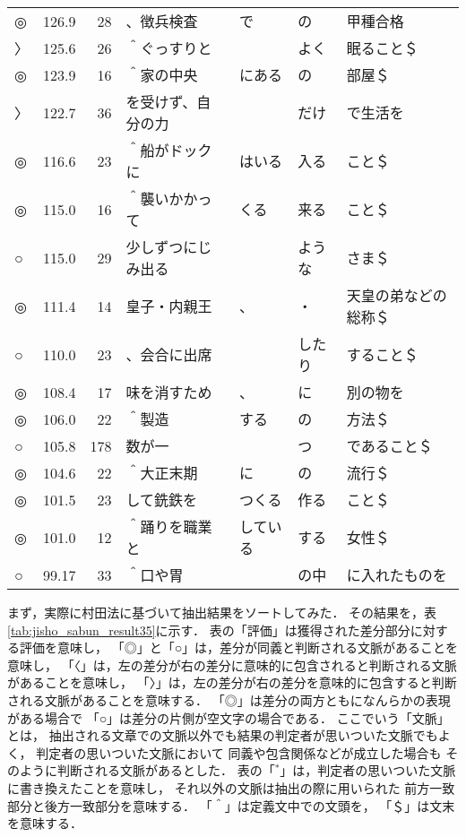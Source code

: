 \begin{table*}[p]
\begin{center}
\begin{tabular}[h]{|l@{ }|r@{ }|r@{ }|l@{ }|l@{ }|l@{ }|l@{ }|}
◎   & 126.9 &  28 & 、徴兵検査           & で         & の         & 甲種合格            \\
〉   & 125.6 &  26 & ＾ぐっすりと         &            & よく       & 眠ること＄          \\
◎   & 123.9 &  16 & ＾家の中央           & にある     & の         & 部屋＄              \\
〉   & 122.7 &  36 & を受けず、自分の力   &            & だけ       & で生活を            \\
◎   & 116.6 &  23 & ＾船がドックに       & はいる     & 入る       & こと＄              \\
◎   & 115.0 &  16 & ＾襲いかかって       & くる       & 来る       & こと＄              \\
○   & 115.0 &  29 & 少しずつにじみ出る   &            & ような     & さま＄              \\
◎   & 111.4 &  14 & 皇子・内親王         & 、         & ・         & 天皇の弟などの総称＄\\
○   & 110.0 &  23 & 、会合に出席         &            & したり     & すること＄          \\
◎   & 108.4 &  17 & 味を消すため         & 、         & に         & 別の物を            \\
◎   & 106.0 &  22 & ＾製造               & する       & の         & 方法＄              \\
○   & 105.8 & 178 & 数が一               &            & つ         & であること＄        \\
◎   & 104.6 &  22 & ＾大正末期           & に         & の         & 流行＄              \\
◎   & 101.5 &  23 & して銑鉄を           & つくる     & 作る       & こと＄              \\
◎   & 101.0 &  12 & ＾踊りを職業と       & している   & する       & 女性＄              \\
○   & 99.17 &  33 & ＾口や胃             &            & の中       & に入れたものを      \\\hline
\end{tabular}
  \end{center}
\end{table*}

まず，実際に村田法に基づいて抽出結果をソートしてみた．
その結果を，表\ref{tab:jisho_sabun_result35}に示す．
表の「評価」は獲得された差分部分に対する評価を意味し，
「◎」と「○」は，差分が同義と判断される文脈があることを意味し，
「〈」は，左の差分が右の差分に意味的に包含されると判断される文脈があることを意味し，
「〉」は，左の差分が右の差分を意味的に包含すると判断される文脈があることを意味する．
「◎」は差分の両方ともになんらかの表現がある場合で
「○」は差分の片側が空文字の場合である．
ここでいう「文脈」とは，
抽出される文章での文脈以外でも結果の判定者が思いついた文脈でもよく，
判定者の思いついた文脈において
同義や包含関係などが成立した場合も
そのように判断される文脈があるとした．
表の「$^*$」は，判定者の思いついた文脈に書き換えたことを意味し，
それ以外の文脈は抽出の際に用いられた
前方一致部分と後方一致部分を意味する．
「＾」は定義文中での文頭を，
「＄」は文末を意味する．

